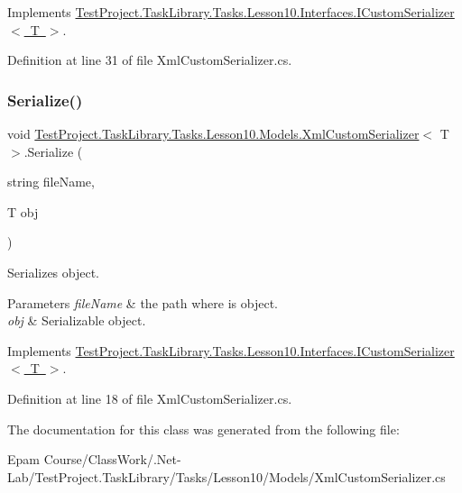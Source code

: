 Implements \mbox{\hyperlink{interface_test_project_1_1_task_library_1_1_tasks_1_1_lesson10_1_1_interfaces_1_1_i_custom_serializer}{Test\+Project.\+Task\+Library.\+Tasks.\+Lesson10.\+Interfaces.\+I\+Custom\+Serializer$<$ T $>$}}.



Definition at line 31 of file Xml\+Custom\+Serializer.\+cs.

\mbox{\label{class_test_project_1_1_task_library_1_1_tasks_1_1_lesson10_1_1_models_1_1_xml_custom_serializer_a43bef2f5e925fde5f8f405dd59afafa7}} 
\subsubsection{\texorpdfstring{Serialize()}{Serialize()}}
{\footnotesize\ttfamily void \mbox{\hyperlink{class_test_project_1_1_task_library_1_1_tasks_1_1_lesson10_1_1_models_1_1_xml_custom_serializer}{Test\+Project.\+Task\+Library.\+Tasks.\+Lesson10.\+Models.\+Xml\+Custom\+Serializer}}$<$ T $>$.Serialize (\begin{DoxyParamCaption}\item[{string}]{file\+Name,  }\item[{T}]{obj }\end{DoxyParamCaption})}



Serializes object. 


\begin{DoxyParams}{Parameters}
{\em file\+Name} & the path where is object.\\
\hline
{\em obj} & Serializable object.\\
\hline
\end{DoxyParams}


Implements \mbox{\hyperlink{interface_test_project_1_1_task_library_1_1_tasks_1_1_lesson10_1_1_interfaces_1_1_i_custom_serializer}{Test\+Project.\+Task\+Library.\+Tasks.\+Lesson10.\+Interfaces.\+I\+Custom\+Serializer$<$ T $>$}}.



Definition at line 18 of file Xml\+Custom\+Serializer.\+cs.



The documentation for this class was generated from the following file\+:\begin{DoxyCompactItemize}
\item 
Epam Course/\+Class\+Work/.\+Net-\/\+Lab/\+Test\+Project.\+Task\+Library/\+Tasks/\+Lesson10/\+Models/Xml\+Custom\+Serializer.\+cs\end{DoxyCompactItemize}
